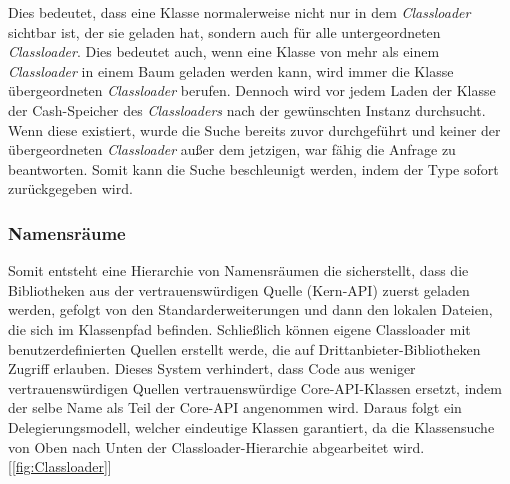 Dies bedeutet, dass eine Klasse normalerweise nicht nur in dem \textit{Classloader} sichtbar ist, der sie geladen hat, sondern auch für alle untergeordneten \textit{Classloader}. Dies bedeutet auch, wenn eine Klasse von mehr als einem \textit{Classloader} in einem Baum geladen werden kann, wird immer die Klasse übergeordneten \textit{Classloader} berufen. 
Dennoch wird vor jedem Laden der Klasse der Cash-Speicher des \textit{Classloaders} nach der gewünschten Instanz durchsucht. Wenn diese existiert, wurde die Suche bereits zuvor durchgeführt und keiner der übergeordneten \textit{Classloader} außer dem jetzigen, war fähig die Anfrage zu beantworten. Somit kann die Suche beschleunigt werden, indem der Type sofort zurückgegeben wird.


\subsubsection{Namensräume}
Somit entsteht eine Hierarchie von Namensräumen die sicherstellt, dass die Bibliotheken aus der vertrauenswürdigen Quelle (Kern-API) zuerst geladen werden, gefolgt von den Standarderweiterungen und dann den lokalen Dateien, die sich im Klassenpfad befinden. Schließlich können eigene Classloader mit benutzerdefinierten Quellen erstellt werde, die auf Drittanbieter-Bibliotheken Zugriff erlauben.
Dieses System verhindert, dass Code aus weniger vertrauenswürdigen Quellen vertrauenswürdige Core-API-Klassen ersetzt, indem der selbe Name als Teil der Core-API angenommen wird. Daraus folgt ein Delegierungsmodell, welcher eindeutige Klassen garantiert, da die Klassensuche von Oben nach Unten der Classloader-Hierarchie abgearbeitet wird. [\ref{fig:Classloader}]








